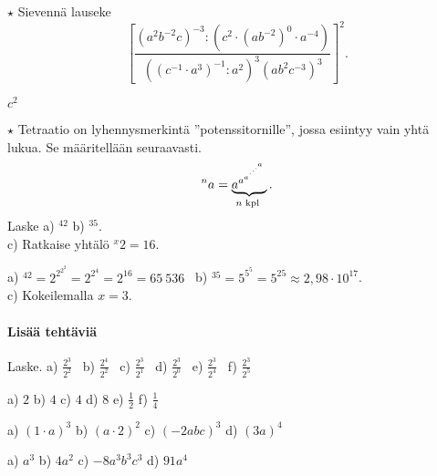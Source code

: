 \begin{tehtavasivu}
\begin{tehtava}
  		$\star$ Sievennä lauseke
$$\left[ \frac{(a^2b^{-2}c)^{-3}:\left(c^2\cdot (ab^{-2})^0 \cdot a^{-4}\right)}
{\left((c^{-1}\cdot a^3)^{-1}:a^2\right)^3(ab^2c^{-3})^3} \right]^2.$$
\begin{vastaus}
$c^2$
\end{vastaus}
\end{tehtava} 
 
\begin{tehtava}
$\star$ Tetraatio on lyhennysmerkintä ''potenssitornille'',
jossa esiintyy vain yhtä lukua. Se määritellään seuraavasti.
\[^na = \underbrace{{a^{a^{a^{\mathstrut^{.^{.^{.^{a}}}}}}}}}_{n\textrm{ kpl }}. \]
Laske \quad a) $^42$  \quad b) $^35$. \\ c) Ratkaise yhtälö $^x2= 16$.
\begin{vastaus}
a) $^42 = 2^{2^{2^2}}=2^{2^4}=2^{16}=65\ 536$ \
b) $^35 = 5^{5^5} = 5^{25} \approx 2,98 \cdot 10^{17}$. \\
c) Kokeilemalla $x =3$.
\end{vastaus}
\end{tehtava}

\paragraph*{Lisää tehtäviä}

  \begin{tehtava}
        Laske. \quad
        a) $\displaystyle \frac{2^3}{2^2}$ \quad \
        b) $\displaystyle \frac{2^4}{2^2}$ \quad \
        c) $\displaystyle \frac{2^3}{2^1}$ \quad \
        d) $\displaystyle \frac{2^3}{2^0}$ \quad \
        e) $\displaystyle \frac{2^3}{2^4}$ \quad \
        f) $\displaystyle \frac{2^3}{2^5}$
        
        \begin{vastaus}
            a) $2$ \qquad
            b) $4$ \qquad
            c) $4$ \qquad
            d) $8$ \qquad
            e) $\frac{1}{2}$ \qquad
            f) $\frac{1}{4}$
        \end{vastaus}
    \end{tehtava}


 \begin{tehtava}
        a) $(1\cdot a)^3$ \qquad
        b) $(a\cdot 2)^2$ \qquad
        c) $(-2abc)^3$ \qquad
        d) $(3a)^4$

        \begin{vastaus}
            a) $a^3$ \qquad
            b) $4a^2$ \qquad
            c) $-8a^3b^3c^3$ \qquad
            d) $91a^4$
        \end{vastaus}
    \end{tehtava}
       

\end{tehtavasivu}
